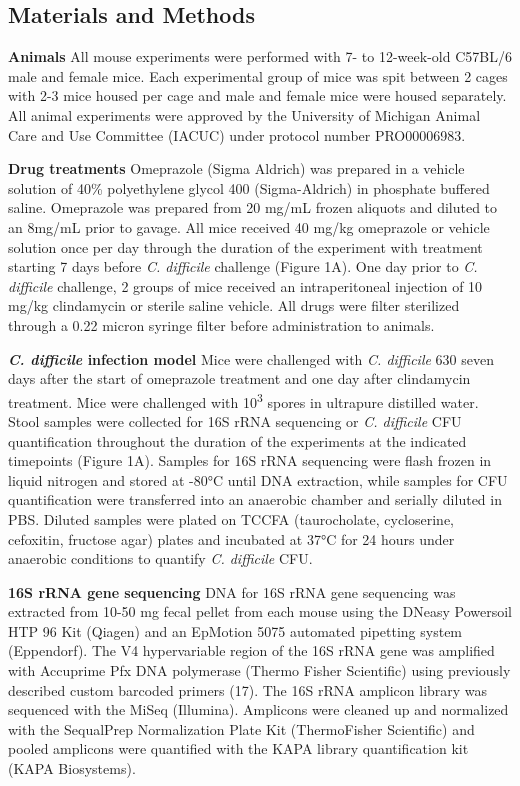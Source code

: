 \documentclass[11pt,]{article}
\begin{document}
\newpage

\subsection{Materials and Methods}\label{materials-and-methods}

\textbf{Animals} All mouse experiments were performed with 7- to
12-week-old C57BL/6 male and female mice. Each experimental group of
mice was spit between 2 cages with 2-3 mice housed per cage and male and
female mice were housed separately. All animal experiments were approved
by the University of Michigan Animal Care and Use Committee (IACUC)
under protocol number PRO00006983.

\textbf{Drug treatments} Omeprazole (Sigma Aldrich) was prepared in a
vehicle solution of 40\% polyethylene glycol 400 (Sigma-Aldrich) in
phosphate buffered saline. Omeprazole was prepared from 20 mg/mL frozen
aliquots and diluted to an 8mg/mL prior to gavage. All mice received 40
mg/kg omeprazole or vehicle solution once per day through the duration
of the experiment with treatment starting 7 days before \emph{C.
difficile} challenge (Figure 1A). One day prior to \emph{C. difficile}
challenge, 2 groups of mice received an intraperitoneal injection of 10
mg/kg clindamycin or sterile saline vehicle. All drugs were filter
sterilized through a 0.22 micron syringe filter before administration to
animals.

\textbf{\emph{C. difficile} infection model} Mice were challenged with
\emph{C. difficile} 630 seven days after the start of omeprazole
treatment and one day after clindamycin treatment. Mice were challenged
with 10\textsuperscript{3} spores in ultrapure distilled water. Stool
samples were collected for 16S rRNA sequencing or \emph{C. difficile}
CFU quantification throughout the duration of the experiments at the
indicated timepoints (Figure 1A). Samples for 16S rRNA sequencing were
flash frozen in liquid nitrogen and stored at -80°C until DNA
extraction, while samples for CFU quantification were transferred into
an anaerobic chamber and serially diluted in PBS. Diluted samples were
plated on TCCFA (taurocholate, cycloserine, cefoxitin, fructose agar)
plates and incubated at 37°C for 24 hours under anaerobic conditions to
quantify \emph{C. difficile} CFU.

\textbf{16S rRNA gene sequencing} DNA for 16S rRNA gene sequencing was
extracted from 10-50 mg fecal pellet from each mouse using the DNeasy
Powersoil HTP 96 Kit (Qiagen) and an EpMotion 5075 automated pipetting
system (Eppendorf). The V4 hypervariable region of the 16S rRNA gene was
amplified with Accuprime Pfx DNA polymerase (Thermo Fisher Scientific)
using previously described custom barcoded primers (17). The 16S rRNA
amplicon library was sequenced with the MiSeq (Illumina). Amplicons were
cleaned up and normalized with the SequalPrep Normalization Plate Kit
(ThermoFisher Scientific) and pooled amplicons were quantified with the
KAPA library quantification kit (KAPA Biosystems).
\end{document}
